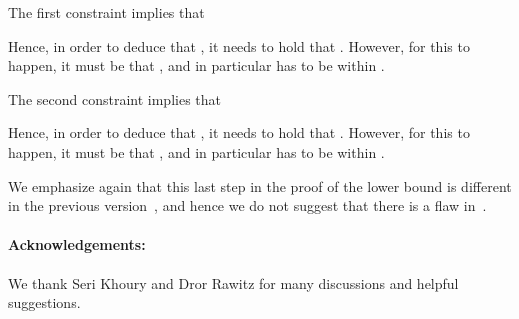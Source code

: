 \documentclass[11pt]{article}
\begin{document}
The first constraint implies that

Hence, in order to deduce that , it needs to hold that . However, for this to happen, it must be that , and in particular  has to be within .

The second constraint implies that

Hence, in order to deduce that , it needs to hold that . However, for this to happen, it must be that , and in particular  has to be within .

We emphasize again that this last step in the proof of the lower bound is different in the previous version~\cite{KMW04}, and hence we do not suggest that there is a flaw in~\cite{KMW04}.

\paragraph{Acknowledgements:} We thank Seri Khoury and Dror Rawitz for many discussions and helpful suggestions.



\end{document}
